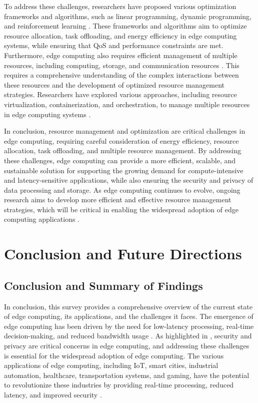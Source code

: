 \documentclass[11pt]{article}
\begin{document}
To address these challenges, researchers have proposed various optimization frameworks and algorithms, such as linear programming, dynamic programming, and reinforcement learning \cite{ref56}. These frameworks and algorithms aim to optimize resource allocation, task offloading, and energy efficiency in edge computing systems, while ensuring that QoS and performance constraints are met. Furthermore, edge computing also requires efficient management of multiple resources, including computing, storage, and communication resources \cite{ref57}. This requires a comprehensive understanding of the complex interactions between these resources and the development of optimized resource management strategies. Researchers have explored various approaches, including resource virtualization, containerization, and orchestration, to manage multiple resources in edge computing systems \cite{ref58}.

In conclusion, resource management and optimization are critical challenges in edge computing, requiring careful consideration of energy efficiency, resource allocation, task offloading, and multiple resource management. By addressing these challenges, edge computing can provide a more efficient, scalable, and sustainable solution for supporting the growing demand for compute-intensive and latency-sensitive applications, while also ensuring the security and privacy of data processing and storage. As edge computing continues to evolve, ongoing research aims to develop more efficient and effective resource management strategies, which will be critical in enabling the widespread adoption of edge computing applications \cite{ref59}.

\section{Conclusion and Future Directions}

\subsection{Conclusion and Summary of Findings}

In conclusion, this survey provides a comprehensive overview of the current state of edge computing, its applications, and the challenges it faces. The emergence of edge computing has been driven by the need for low-latency processing, real-time decision-making, and reduced bandwidth usage \cite{ref1}. As highlighted in \cite{ref5}, security and privacy are critical concerns in edge computing, and addressing these challenges is essential for the widespread adoption of edge computing. The various applications of edge computing, including IoT, smart cities, industrial automation, healthcare, transportation systems, and gaming, have the potential to revolutionize these industries by providing real-time processing, reduced latency, and improved security \cite{ref60} \cite{ref61}.
\end{document}
